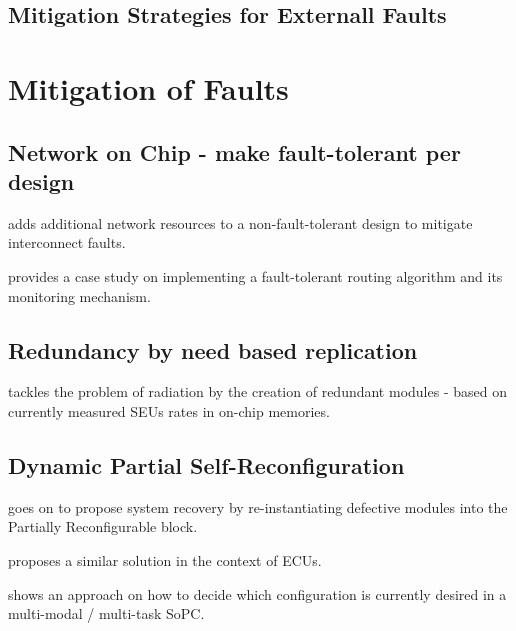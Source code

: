 \documentclass[10pt, journal]{IEEEtran}
\begin{document}
\subsection{Mitigation Strategies for Externall Faults}

\section{Mitigation of Faults}
\subsection{Network on Chip - make fault-tolerant per design}
\cite{yesil_fpga_2016} adds additional network resources to a non-fault-tolerant design to mitigate interconnect faults.

\cite{lu_fault-tolerant_2015} provides a case study on implementing a fault-tolerant routing algorithm and its monitoring mechanism.
\subsection{Redundancy by need based replication}
\cite{glein_self-adaptive_2014} tackles the problem of radiation by the creation of redundant modules - based on currently measured \glspl{SEU} rates in on-chip memories.
\subsection{Dynamic Partial Self-Reconfiguration}
\cite{alkady_dynamic_2015} goes on to propose system recovery by re-instantiating defective modules into the Partially Reconfigurable block.

\cite{shanker_enhancing_nodate} proposes a similar solution in the context of \glspl{ECU}.

\cite{sharma_run-time_2018} shows an approach on how to decide which configuration is currently desired in a multi-modal / multi-task \gls{SoPC}.
\printglossaries 



\end{document}
